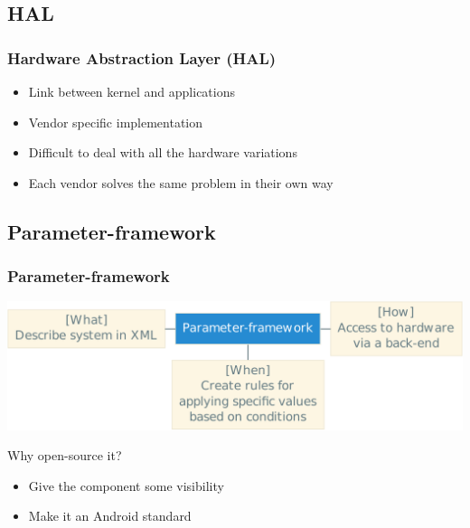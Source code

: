 \subsection{HAL}
\begin{frame}
    \frametitle{Hardware Abstraction Layer (HAL)}
    \begin{itemize}
        \item Link between kernel and applications
        \item Vendor specific implementation
        \item Difficult to deal with all the hardware variations
        \item Each vendor solves the same problem in their own way
    \end{itemize}
\end{frame}

\subsection{Parameter-framework}
\begin{frame}
    \frametitle{Parameter-framework}
    \includegraphics[width=\textwidth]{./img/pfwContext.pdf}
    \begin{block}{Why open-source it?}
        \begin{itemize}
            \item Give the component some visibility
            \item Make it an Android standard
        \end{itemize}
    \end{block}
\end{frame}
